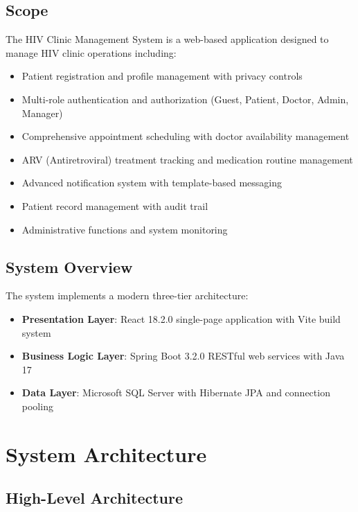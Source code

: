 \documentclass[12pt,a4paper]{article}
\begin{document}
\subsection{Scope}
The HIV Clinic Management System is a web-based application designed to manage HIV clinic operations including:
\begin{itemize}
    \item Patient registration and profile management with privacy controls
    \item Multi-role authentication and authorization (Guest, Patient, Doctor, Admin, Manager)
    \item Comprehensive appointment scheduling with doctor availability management
    \item ARV (Antiretroviral) treatment tracking and medication routine management
    \item Advanced notification system with template-based messaging
    \item Patient record management with audit trail
    \item Administrative functions and system monitoring
\end{itemize}

\subsection{System Overview}
The system implements a modern three-tier architecture:
\begin{itemize}
    \item \textbf{Presentation Layer}: React 18.2.0 single-page application with Vite build system
    \item \textbf{Business Logic Layer}: Spring Boot 3.2.0 RESTful web services with Java 17
    \item \textbf{Data Layer}: Microsoft SQL Server with Hibernate JPA and connection pooling
\end{itemize}

\section{System Architecture}

\subsection{High-Level Architecture}
\end{document}
